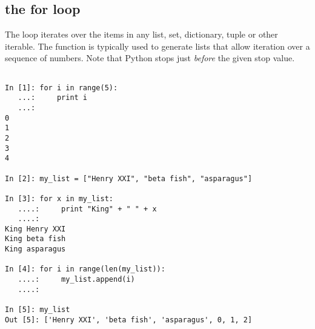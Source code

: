 \subsection*{the for loop}
\begin{example}

The  loop iterates over the items in any list, set, dictionary, tuple or other iterable. 
The  function is typically used to generate lists that allow iteration 
over a sequence of numbers. Note that Python stops just \emph{before} the given stop value. 

\begin{lstlisting}

In [1]: for i in range(5):
   ...:     print i
   ...:     
0
1
2
3
4

In [2]: my_list = ["Henry XXI", "beta fish", "asparagus"]

In [3]: for x in my_list:
   ....:     print "King" + " " + x
   ....:     
King Henry XXI
King beta fish
King asparagus

In [4]: for i in range(len(my_list)):
   ....:     my_list.append(i)
   ....:     

In [5]: my_list
Out [5]: ['Henry XXI', 'beta fish', 'asparagus', 0, 1, 2]

\end{lstlisting}
\end{example}


